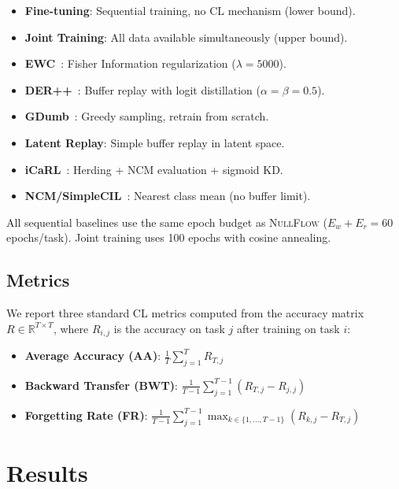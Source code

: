 \documentclass[10pt,twocolumn,letterpaper]{article}
\newcommand{\ours}{\textsc{NullFlow}}
\begin{document}
\begin{itemize}[leftmargin=*,itemsep=1pt]
  \item \textbf{Fine-tuning}: Sequential training, no CL mechanism (lower bound).
  \item \textbf{Joint Training}: All data available simultaneously (upper bound).
  \item \textbf{EWC}~\cite{kirkpatrick2017overcoming}: Fisher Information regularization ($\lambda=5000$).
  \item \textbf{DER++}~\cite{buzzega2020dark}: Buffer replay with logit distillation ($\alpha=\beta=0.5$).
  \item \textbf{GDumb}~\cite{prabhu2020gdumb}: Greedy sampling, retrain from scratch.
  \item \textbf{Latent Replay}: Simple buffer replay in latent space.
  \item \textbf{iCaRL}~\cite{rebuffi2017icarl}: Herding + NCM evaluation + sigmoid KD.
  \item \textbf{NCM/SimpleCIL}~\cite{zhou2024revisiting}: Nearest class mean (no buffer limit).
\end{itemize}

All sequential baselines use the same epoch budget as \ours{} ($E_w + E_r = 60$ epochs/task). Joint training uses 100 epochs with cosine annealing.

\subsection{Metrics}

We report three standard CL metrics computed from the accuracy matrix $R \in \mathbb{R}^{T \times T}$, where $R_{i,j}$ is the accuracy on task $j$ after training on task $i$:
\begin{itemize}[leftmargin=*,itemsep=1pt]
  \item \textbf{Average Accuracy (AA)}: $\frac{1}{T}\sum_{j=1}^{T} R_{T,j}$
  \item \textbf{Backward Transfer (BWT)}: $\frac{1}{T-1}\sum_{j=1}^{T-1}(R_{T,j} - R_{j,j})$
  \item \textbf{Forgetting Rate (FR)}: $\frac{1}{T-1}\sum_{j=1}^{T-1}\max_{k \in \{1,\dots,T-1\}}(R_{k,j} - R_{T,j})$
\end{itemize}

\section{Results}
\label{sec:results}
\end{document}
